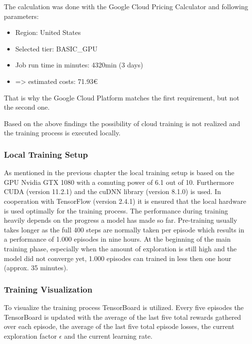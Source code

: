 The calculation was done with the Google Cloud Pricing Calculator \cite{PreisRechner2021} and following parameters:
\begin{itemize}
	\item Region: United States
	\item Selected tier: BASIC\_GPU
	\item Job run time in minutes: 4320min (3 days)
	\item => estimated costs: 71.93€
\end{itemize}

That is why the Google Cloud Platform matches the first requirement, but not the second one.

Based on the above findings the possibility of cloud training is not realized and the training process is executed locally. 

\subsubsection{Local Training Setup}
\label{ch:approachBg}

As mentioned in the previous chapter the local training setup is based on the GPU Nvidia GTX 1080 with a comuting power of 6.1 out of 10. Furthermore CUDA (version 11.2.1) and the cuDNN library (version 8.1.0) is used. In cooperation with TensorFlow (version 2.4.1) it is ensured that the local hardware is used optimally for the training process. The performance during training heavily depends on the progress a model has made so far. Pre-training usually takes longer as the full 400 steps are normally taken per episode which results in a performance of 1.000 episodes in nine hours. At the beginning of the main training phase, especially when the amount of exploration is still high and the model did not converge yet, 1.000 episodes can trained in less then one hour (approx. 35 minutes).  

\subsubsection{Training Visualization}
\label{ch:approachBh}

To visualize the training process TensorBoard is utilized. Every five episodes the TensorBoard is updated with the average of the last five total rewards gathered over each episode, the average of the last five total episode losses, the current exploration factor $\epsilon$ and the current learning rate. 


